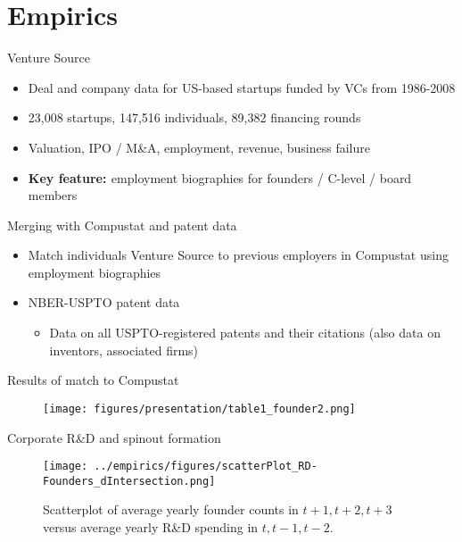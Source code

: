 \documentclass[english,usenames,dvipsnames]{beamer}
\begin{document}
\section{Empirics}

\begin{frame}
\tableofcontents[currentsection]
\end{frame}

\begin{frame}{Venture Source}
\begin{itemize}
	\item Deal and company data for US-based startups funded by VCs from 1986-2008
	\item 23,008 startups, 147,516 individuals, 89,382 financing rounds
	\item Valuation, IPO / M\&A, employment, revenue, business failure
	\item \textbf{\alert{Key feature: }} employment biographies for founders / C-level / board members
\end{itemize}
\end{frame}

\begin{frame}{Merging with Compustat and patent data}
\begin{itemize}
\item Match individuals Venture Source to previous employers in Compustat using employment biographies
\item NBER-USPTO patent data
\begin{itemize}
	\item Data on all USPTO-registered patents and their citations (also data on inventors, associated firms)
\end{itemize}
\end{itemize}
\end{frame}

\begin{frame}{Results of match to Compustat}
\begin{figure}
	\texttt{[image: figures/presentation/table1\_founder2.png]}
\end{figure}
\end{frame}

\begin{frame}{Corporate R\&D and spinout formation}
\begin{figure}[!htb]
	\centering
	\texttt{[image: ../empirics/figures/scatterPlot\_RD-Founders\_dIntersection.png]}
	\caption{Scatterplot of average yearly founder counts in $t+1,t+2,t+3$ versus average yearly R\&D spending in $t,t-1,t-2$.}
\end{figure}
\end{frame}
\end{document}
